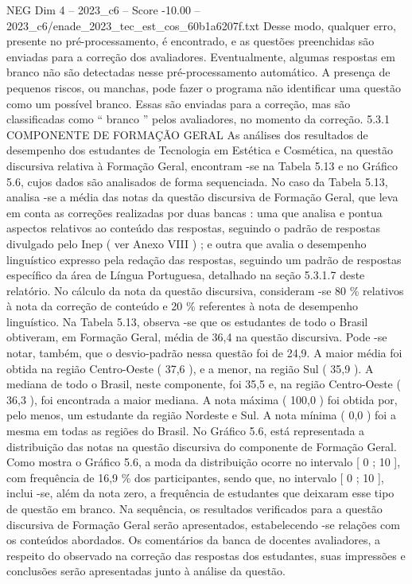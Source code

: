 \begin{textsample}{NEG Dim 4 – 2023\_c6 – Score -10.00 – 2023\_c6/enade\_2023\_tec\_est\_cos\_60b1a6207f.txt}
Desse modo, qualquer erro, presente no pré-processamento, é encontrado, e as questões preenchidas são enviadas para a correção dos avaliadores.
Eventualmente, algumas respostas em branco não são detectadas nesse pré-processamento automático.
A presença de pequenos riscos, ou manchas, pode fazer o programa não identificar uma questão como um possível branco.
Essas são enviadas para a correção, mas são classificadas como “ branco ” pelos avaliadores, no momento da correção. 5.3.1 COMPONENTE DE FORMAÇÃO GERAL As análises dos resultados de desempenho dos estudantes de Tecnologia em Estética e Cosmética, na questão discursiva relativa à Formação Geral, encontram -se na Tabela 5.13 e no Gráfico 5.6, cujos dados são analisados de forma sequenciada.
No caso da Tabela 5.13, analisa -se a média das notas da questão discursiva de Formação Geral, que leva em conta as correções realizadas por duas bancas : uma que analisa e pontua aspectos relativos ao conteúdo das respostas, seguindo o padrão de respostas divulgado pelo Inep ( ver Anexo VIII ) ; e outra que avalia o desempenho linguístico expresso pela redação das respostas, seguindo um padrão de respostas específico da área de Língua Portuguesa, detalhado na seção 5.3.1.7 deste relatório.
No cálculo da nota da questão discursiva, consideram -se 80 \% relativos à nota da correção de conteúdo e 20 \% referentes à nota de desempenho linguístico.
Na Tabela 5.13, observa -se que os estudantes de todo o Brasil obtiveram, em Formação Geral, média de 36,4 na questão discursiva.
Pode -se notar, também, que o desvio-padrão nessa questão foi de 24,9.
A maior média foi obtida na região Centro-Oeste ( 37,6 ), e a menor, na região Sul ( 35,9 ).
A mediana de todo o Brasil, neste componente, foi 35,5 e, na região Centro-Oeste ( 36,3 ), foi encontrada a maior mediana.
A nota máxima ( 100,0 ) foi obtida por, pelo menos, um estudante da região Nordeste e Sul.
A nota mínima ( 0,0 ) foi a mesma em todas as regiões do Brasil.
No Gráfico 5.6, está representada a distribuição das notas na questão discursiva do componente de Formação Geral.
Como mostra o Gráfico 5.6, a moda da distribuição ocorre no intervalo [ 0 ; 10 ], com frequência de 16,9 \% dos participantes, sendo que, no intervalo [ 0 ; 10 ], inclui -se, além da nota zero, a frequência de estudantes que deixaram esse tipo de questão em branco.
Na sequência, os resultados verificados para a questão discursiva de Formação Geral serão apresentados, estabelecendo -se relações com os conteúdos abordados.
Os comentários da banca de docentes avaliadores, a respeito do observado na correção das respostas dos estudantes, suas impressões e conclusões serão apresentadas junto à análise da questão.

\end{textsample}
